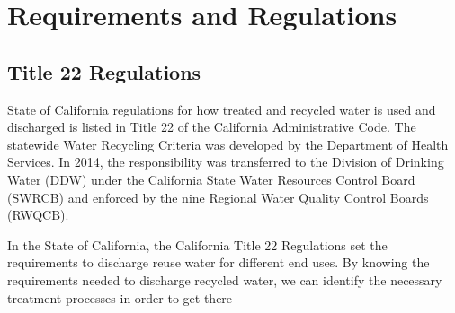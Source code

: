
\chapter{Requirements and Regulations}

\section{Title 22 Regulations} 

State of California regulations for how treated and recycled water is used and discharged is listed in Title 22 of the California Administrative Code. The statewide Water Recycling Criteria was developed by the Department of Health Services.  In 2014, the responsibility was transferred to the Division of Drinking Water (DDW) under the California State Water Resources Control Board (SWRCB) and enforced by the nine Regional Water Quality Control Boards (RWQCB).

In the State of California, the California Title 22 Regulations set the requirements to discharge reuse water for different end uses.  By knowing the requirements needed to discharge recycled water, we can identify the necessary treatment processes in order to get there